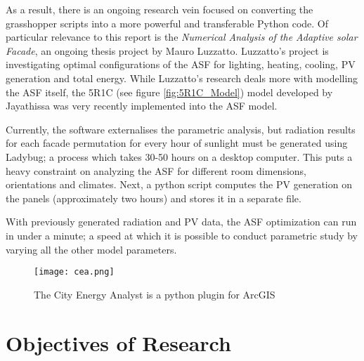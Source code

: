 As a result, there is an ongoing research vein focused on converting the grasshopper scripts into a more powerful and transferable Python code. Of particular relevance to this report is the \textit{Numerical Analysis of the Adaptive solar Facade}, an ongoing thesis project by Mauro Luzzatto. Luzzatto's project is investigating optimal configurations of the ASF for lighting, heating, cooling, PV generation and total energy. While Luzzatto's research deals more with modelling the ASF itself, the 5R1C (see figure \ref{fig:5R1C_Model}) model developed by Jayathissa was very recently implemented into the ASF model.\par

Currently, the software externalises the parametric analysis, but radiation results for each facade permutation for every hour of sunlight must be generated using Ladybug; a process which takes 30-50 hours on a desktop computer. This puts a heavy constraint on analyzing the ASF for different room dimensions, orientations and climates. Next, a python script computes the PV generation on the panels (approximately two hours) and stores it in a separate file.\par

With previously generated radiation and PV data, the ASF optimization can run in under a minute; a speed at which it is possible to conduct parametric study by varying all the other model parameters.

\begin{figure}[h] %
  \begin{center}
    \texttt{[image: cea.png]}
    \caption{The City Energy Analyst is a python plugin for ArcGIS}
    \label{fig: CEA}
  \end{center} 
\end{figure}

\pagebreak
\section{Objectives of Research}\

